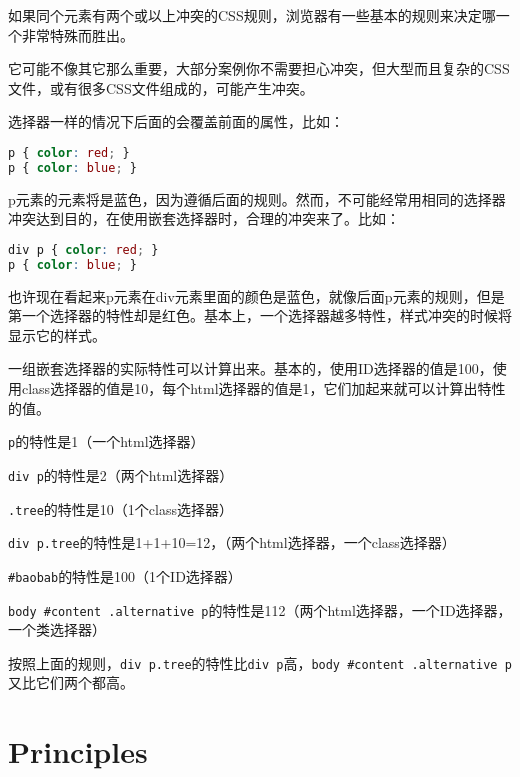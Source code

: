如果同个元素有两个或以上冲突的CSS规则\cite{cascading}，浏览器有一些基本的规则\cite{cascading}来决定哪一个非常特殊而胜出。

它可能不像其它那么重要，大部分案例你不需要担心冲突，但大型而且复杂的CSS文件，或有很多CSS文件组成的，可能产生冲突。

选择器一样的情况下后面的会覆盖前面的属性，比如：


\begin{lstlisting}[language=CSS]
p { color: red; }
p { color: blue; }
\end{lstlisting}

p元素的元素将是蓝色，因为遵循后面的规则。然而，不可能经常用相同的选择器冲突达到目的，在使用嵌套选择器时，合理的冲突来了。比如：

\begin{lstlisting}[language=CSS]
div p { color: red; }
p { color: blue; }
\end{lstlisting}

也许现在看起来p元素在div元素里面的颜色是蓝色，就像后面p元素的规则，但是第一个选择器的特性却是红色。基本上，一个选择器越多特性，样式冲突的时候将显示它的样式。

一组嵌套选择器的实际特性可以计算出来。基本的，使用ID选择器的值是100，使用class选择器的值是10，每个html选择器的值是1，它们加起来就可以计算出特性的值。

\begin{compactitem}[$\circ$]
\item \texttt{p}的特性是1（一个html选择器）
\item \texttt{div p}的特性是2（两个html选择器）
\item \texttt{.tree}的特性是10（1个class选择器）
\item \texttt{div p.tree}的特性是1+1+10=12，（两个html选择器，一个class选择器）
\item \texttt{\#baobab}的特性是100（1个ID选择器）
\item \texttt{body \#content .alternative p}的特性是112（两个html选择器，一个ID选择器，一个类选择器）
\end{compactitem}

按照上面的规则，\texttt{div p.tree}的特性比\texttt{div p}高，\texttt{body \#content .alternative p}又比它们两个都高。

\clearpage

\section{Principles}


